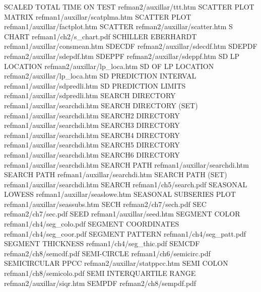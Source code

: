SCALED TOTAL TIME ON TEST               refman2/auxillar/ttt.htm
SCATTER PLOT MATRIX                     refman1/auxillar/scatplma.htm
SCATTER PLOT                            refman1/auxillar/factplot.htm
SCATTER                                 refman2/auxillar/scatter.htm
S CHART                                 refman1/ch2/s_chart.pdf
SCHILLER EBERHARDT                      refman1/auxillar/consmean.htm
SDECDF                                  refman2/auxillar/sdecdf.htm
SDEPDF                                  refman2/auxillar/sdepdf.htm
SDEPPF                                  refman2/auxillar/sdeppf.htm
SD LP LOCATION                          refman2/auxillar/lp_loca.htm
SD OF LP LOCATION                       refman2/auxillar/lp_loca.htm
SD PREDICTION INTERVAL                  refman1/auxillar/sdpredli.htm
SD PREDICTION LIMITS                    refman1/auxillar/sdpredli.htm
SEARCH DIRECTORY                        refman1/auxillar/searchdi.htm
SEARCH DIRECTORY (SET)                  refman1/auxillar/searchdi.htm
SEARCH2 DIRECTORY                       refman1/auxillar/searchdi.htm
SEARCH3 DIRECTORY                       refman1/auxillar/searchdi.htm
SEARCH4 DIRECTORY                       refman1/auxillar/searchdi.htm
SEARCH5 DIRECTORY                       refman1/auxillar/searchdi.htm
SEARCH6 DIRECTORY                       refman1/auxillar/searchdi.htm
SEARCH PATH                             refman1/auxillar/searchdi.htm
SEARCH PATH                             refman1/auxillar/searchdi.htm
SEARCH PATH (SET)                       refman1/auxillar/searchdi.htm
SEARCH                                  refman1/ch5/search.pdf
SEASONAL LOWESS                         refman1/auxillar/seaslowe.htm
SEASONAL SUBSERIES PLOT                 refman1/auxillar/seassubs.htm
SECH                                    refman2/ch7/sech.pdf
SEC                                     refman2/ch7/sec.pdf
SEED                                    refman1/auxillar/seed.htm
SEGMENT COLOR                           refman1/ch4/seg_colo.pdf
SEGMENT COORDINATES                     refman1/ch4/seg_coor.pdf
SEGMENT PATTERN                         refman1/ch4/seg_patt.pdf
SEGMENT THICKNESS                       refman1/ch4/seg_thic.pdf
SEMCDF                                  refman2/ch8/semcdf.pdf
SEMI-CIRCLE                             refman1/ch6/semicirc.pdf
SEMICIRCULAR PPCC                       refman2/auxillar/statppcc.htm
SEMI COLON                              refman1/ch8/semicolo.pdf
SEMI INTERQUARTILE RANGE                refman2/auxillar/siqr.htm
SEMPDF                                  refman2/ch8/sempdf.pdf
